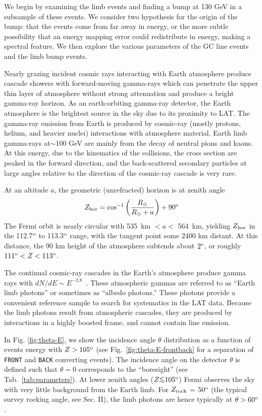 \documentclass[aps,twocolumn,prd,superscriptaddress,showpacs,nofootinbib,fixfloat]{revtex4}
\newcommand{\be}{\begin{equation}}
\newcommand{\ee}{\end{equation}}
\newcommand{\degree}{^{\rm o}}
\newcommand{\zrock}{$Z_{\rm rock}$}
\def\la{\vcenter{\hbox{$<$}\offinterlineskip\hbox{$\sim$}}}
\begin{document}
We begin by examining the limb events and finding a bump at
130 GeV in a subsample of these events.  We consider two
hypothesis for the origin of the bump: that the events come
from far away in energy, or the more subtle possibility that
an energy mapping error could redistribute in energy, making
a spectral feature.  We then explore the various parameters
of the GC line events and the limb bump events.
\medskip

Nearly grazing incident cosmic rays interacting with Earth
atmosphere produce cascade showers with forward-moving
gamma-rays which can penetrate the upper thin layer of
atmosphere without strong attenuation and produce a bright
gamma-ray horizon. As an earth-orbiting gamma-ray detector,
the Earth atmosphere is the brightest source in the sky due
to its proximity to LAT. The gamma-ray emission from Earth
is produced by cosmic-ray (mostly protons, helium, and
heavier nuclei) interactions with atmosphere material. Earth
limb gamma-rays at$\sim$100 GeV are mainly from the decay of
neutral pions and kaons. At this energy, due to the
kinematics of the collisions, the cross section are peaked
in the forward direction, and the back-scattered secondary
particles at large angles relative to the direction of the
cosmic-ray cascade is very rare.

At an altitude $a$, the geometric (unrefracted) horizon is
at zenith angle \be Z_{\rm hor} =
\cos^{-1}\left(\frac{R_\oplus}{R_\oplus+a}\right)+90\degree
\ee The Fermi orbit is nearly circular with 535~km $< a <$
564~km, yielding $Z_{\rm hor}$ in the 112.7$\degree$ to
113.3$\degree$ range, with the tangent point some 2400 km
distant.  At this distance, the 90 km height of the
atmosphere subtends about $2\degree$, or roughly $111\degree
< Z < 113\degree$.

The continual cosmic-ray cascades in the Earth's atmosphere
produce gamma rays with $dN/dE \sim
E^{-2.8}$~\citep{FermiLimb}. These atmospheric gammas are
referred to as ``Earth limb photons'' or sometimes as
``albedo photons.''  These photons provide a convenient
reference sample to search for systematics in the LAT data.
Because the limb photons result from atmospheric cascades,
they are produced by interactions in a highly boosted frame,
and cannot contain line emission.
\medskip

In Fig. \ref{fig:theta-E}, we show the incidence angle $\theta$ distribution
as a function of events energy with $Z > 105\degree$ (see
Fig.~\ref{fig:theta-E-frontback} for a separation of \texttt{FRONT} and
\texttt{BACK} converting events).  The incidence angle on the detector
$\theta$ is defined such that $\theta=0$ corresponds to the ``boresight'' (see
Tab.~\ref{tab:parameters}).  At lower zenith angles ($Z \la 105\degree$) Fermi
observes the sky with very little background from the Earth limb.  For \zrock
= $50\degree$ (the typical survey rocking angle, see Sec. II), the limb
photons are hence typically at $\theta > 60\degree$.
\end{document}
